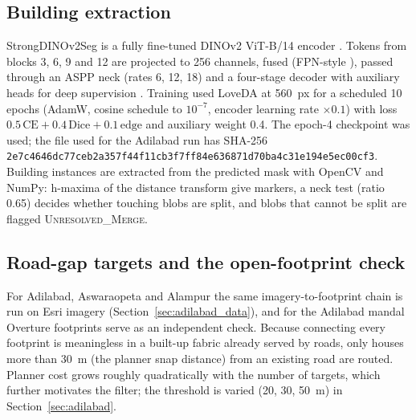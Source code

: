 \documentclass[12pt,a4paper]{article}
\newcommand{\dinoseg}{StrongDINOv2Seg}
\begin{document}
\subsection{Building extraction}
\dinoseg{} is a fully fine-tuned DINOv2 ViT-B/14 encoder \cite{oquab2023dinov2}. Tokens from blocks 3, 6, 9 and 12 are projected to 256 channels, fused (FPN-style \cite{lin2017fpn}), passed through an ASPP neck (rates 6, 12, 18) \cite{chen2018deeplabv3plus} and a four-stage decoder with auxiliary heads for deep supervision \cite{lee2015dsn}. Training used LoveDA \cite{wang2021loveda} at 560~px for a scheduled 10 epochs (AdamW, cosine schedule to $10^{-7}$, encoder learning rate $\times 0.1$) with loss $0.5\,\mathrm{CE}+0.4\,\mathrm{Dice}+0.1\,\mathrm{edge}$ \cite{milletari2016vnet} and auxiliary weight 0.4. The epoch-4 checkpoint was used; the file used for the Adilabad run has SHA-256 \texttt{2e7c4646dc77ceb2\allowbreak a357f44f11cb3f7f\allowbreak f84e636871d70ba4\allowbreak c31e194e5ec00cf3}. Building instances are extracted from the predicted mask with OpenCV and NumPy: h-maxima of the distance transform give markers, a neck test (ratio 0.65) decides whether touching blobs are split, and blobs that cannot be split are flagged \textsc{Unresolved\_Merge}.

\subsection{Road-gap targets and the open-footprint check}
For Adilabad, Aswaraopeta and Alampur the same imagery-to-footprint chain is run on Esri imagery (Section~\ref{sec:adilabad_data}), and for the Adilabad mandal Overture footprints serve as an independent check. Because connecting every footprint is meaningless in a built-up fabric already served by roads, only houses more than 30~m (the planner snap distance) from an existing road are routed. Planner cost grows roughly quadratically with the number of targets, which further motivates the filter; the threshold is varied (20, 30, 50~m) in Section~\ref{sec:adilabad}.
\end{document}
